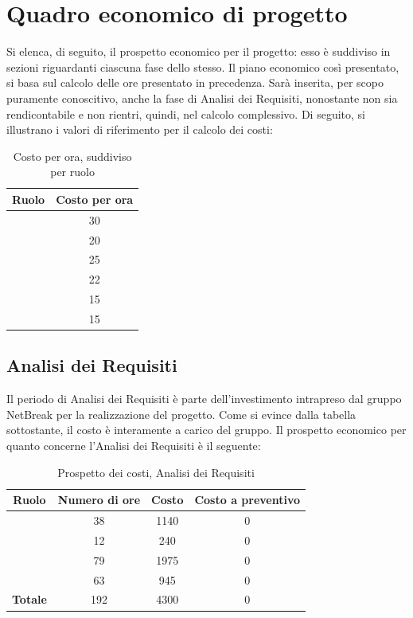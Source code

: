 \newpage

\section{Quadro economico di progetto}
Si elenca, di seguito, il prospetto economico per il progetto: esso è suddiviso in sezioni riguardanti ciascuna fase dello stesso. Il piano economico così presentato, si basa sul calcolo delle ore presentato in precedenza. Sarà inserita, per scopo puramente conoscitivo, anche la fase di Analisi dei Requisiti, nonostante non sia rendicontabile e non rientri, quindi, nel calcolo complessivo. Di seguito, si illustrano i valori di riferimento per il calcolo dei costi:

\begin{table}[H]
	\begin{center}
		\begin{tabular}{|c|c|}
			\hline
			\textbf{Ruolo}	& \textbf{Costo per ora} \\
			\hline
			\Res	&	30	\\
			\hline
			\Amm	&	20	\\
			\hline
			\Ana	&	25	\\
			\hline
			\Prog	&	22	\\
			\hline
			\Progr	&	15	\\
			\hline
			\Ver	&	15	\\
			\hline
		\end{tabular}
	\end{center}
	\caption{Costo per ora, suddiviso per ruolo}
\end{table}

\subsection{Analisi dei Requisiti}

Il periodo di Analisi dei Requisiti è parte dell'investimento intrapreso dal gruppo NetBreak per la realizzazione del progetto. Come si evince dalla tabella sottostante, il costo è interamente a carico del gruppo. Il prospetto economico per quanto concerne l'Analisi dei Requisiti è il seguente:


\begin{table}[H]
	\begin{center}
		\begin{tabular}{|c|c|c|c|}
			\hline
			\textbf{Ruolo}	& \textbf{Numero di ore} & \textbf{Costo} & \textbf{Costo a preventivo} \\
			\hline
			\Res	&	38  &	1140 &  0	\\
			\hline
			\Amm	&	12  &	240  &  0	\\
			\hline
			\Ana	&	79  &	1975 &  0	\\
			\hline
			\Ver	&	63  &	945 &  0	\\
			\hline
			\textbf{Totale}  &	192	&	4300  &  0	\\
			\hline
		\end{tabular}
	\end{center}
	\caption{Prospetto dei costi, Analisi dei Requisiti }
\end{table}

